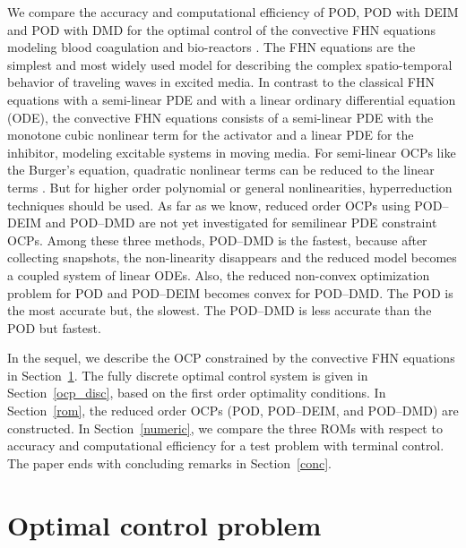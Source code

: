 \documentclass[preprint,12pt]{elsarticle}
\begin{document}
We compare the accuracy and computational efficiency of  POD, POD with DEIM and POD with DMD for the optimal control of the convective FHN equations modeling blood coagulation and bio-reactors \cite{Ermakova09opo,Ermakova05}. The FHN equations are the simplest and most widely used model for describing the complex spatio-temporal behavior of traveling waves in excited media.  In contrast to the classical FHN  equations \cite{Fitzhugh61,Nagumo62} with a semi-linear PDE and with a linear ordinary differential equation (ODE), the convective FHN equations consists of a  semi-linear PDE with the monotone cubic nonlinear term for the activator and a linear PDE for the inhibitor, modeling excitable systems in moving media. For semi-linear OCPs like the Burger's equation, quadratic nonlinear terms  can be reduced to the linear terms \cite{Baumann18}. But for higher order polynomial or general nonlinearities, hyperreduction techniques should be used.  As far as we know, reduced order OCPs using POD--DEIM and POD--DMD are not yet investigated for semilinear PDE constraint OCPs.  Among these three methods, POD--DMD is the fastest, because after collecting snapshots, the non-linearity disappears and the reduced model becomes a coupled system of linear ODEs. Also, the reduced non-convex optimization problem for POD and POD--DEIM becomes convex for POD--DMD.  The POD is the most accurate but, the slowest. The POD--DMD is less accurate than the POD but fastest.


In the sequel, we describe the OCP constrained by the convective FHN equations in Section~\ref{sec:ocp}. The fully discrete optimal control system is given in Section~\ref{ocp_disc}, based on the first order optimality conditions. In Section~\ref{rom}, the reduced order OCPs (POD, POD--DEIM, and POD--DMD) are constructed. In Section~\ref{numeric}, we compare the three ROMs with respect to accuracy and computational efficiency for a test problem with terminal control. The paper ends with concluding remarks in Section~\ref{conc}.

\section{Optimal control problem}
\label{sec:ocp}
\end{document}
